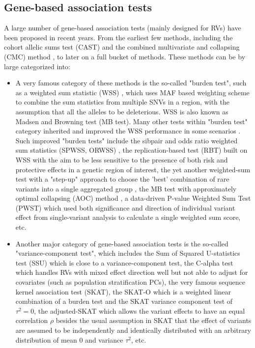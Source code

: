 \documentclass[12pt]{article}
\begin{document}
\subsection*{Gene-based association tests}
A large number of gene-based association tests (mainly designed for RVs) have been proposed in recent years. From the earliest few methods, including the cohort allelic sums test (CAST)\cite{Morgenthaler2007} and the combined multivariate and collapsing (CMC) method \cite{Li2008}, to later on a full bucket of methods. These methods can be by large categorized into:
\begin{itemize}
\item A very famous category of these methods is the so-called "burden test", such as a weighted sum statistic (WSS) \cite{Madsen2009}, which uses MAF based weighting scheme to combine the sum statistics from multiple SNVs in a region, with the assumption that all the alleles to be deleterious. WSS is also known as Madsen and Browning test (MB test). Many other tests within "burden test" category inherited and improved the WSS performance in some scenarios \cite{Hoffmann2010,Zhang2010,Ionita-Laza2011,Feng2011}. Such improved "burden tests" include the sibpair and odds ratio weighted sum statistics (SPWSS, ORWSS) \cite{Zhu2010,Feng2011}, the replication-based test (RBT) \cite{Ionita-Laza2011} built on WSS with the aim to be less sensitive to the presence of both risk and protective effects in a genetic region of interest, the yet another weighted-sum test with a "step-up" approach to choose the 'best' combination of rare variants into a single aggregated group \cite{Hoffmann2010}, the MB test with approximately optimal collapsing (AOC) method \cite{Zhang2010}, a data-driven P-value Weighted Sum Test (PWST) \cite{Zhang2011} which used both significance and direction of individual variant effect from single-variant analysis to calculate a single weighted sum score, etc.
\item Another major category of gene-based association tests is the so-called "variance-component test", which includes the Sum of Squared U-statistics test (SSU) \cite{Pan2009} which is close to a variance-component test, the C-alpha test \cite{Neale2011} which handles RVs with mixed effect direction well but not able to adjust for covariates (such as population stratification PCs), the very famous sequence kernel association test (SKAT)\cite{Wu2011}, the SKAT-O \cite{Lee2012a,Lee2012} which is a weighted linear combination of a burden test and the SKAT variance component test of $\tau^2 = 0$, the adjusted-SKAT \cite{Oualkacha2013} which allows the variant effects to have an equal correlation $\rho$ besides the usual assumption in SKAT that the effect of variants are assumed to be independently and identically distributed with an arbitrary distribution of mean 0 and variance $\tau^2$, etc.

\end{itemize}
\end{document}
